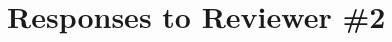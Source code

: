 \documentclass[article,letterpaper,times,12pt,listings-bw,microtype]{article}
\begin{document}
 



\section{Responses to Reviewer \#2}

\end{document}
